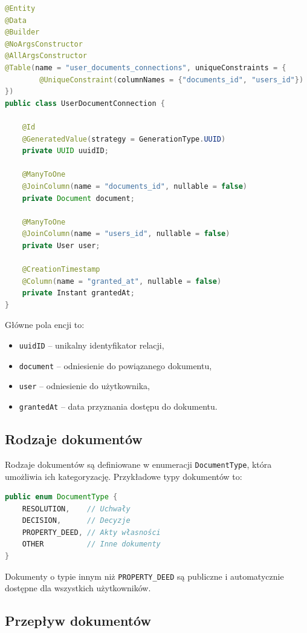 \begin{lstlisting}[language=Java, style=JavaStyle, caption=Encja \texttt{UserDocumentConnection}]
@Entity
@Data
@Builder
@NoArgsConstructor
@AllArgsConstructor
@Table(name = "user_documents_connections", uniqueConstraints = {
        @UniqueConstraint(columnNames = {"documents_id", "users_id"})
})
public class UserDocumentConnection {

    @Id
    @GeneratedValue(strategy = GenerationType.UUID)
    private UUID uuidID;

    @ManyToOne
    @JoinColumn(name = "documents_id", nullable = false)
    private Document document;

    @ManyToOne
    @JoinColumn(name = "users_id", nullable = false)
    private User user;

    @CreationTimestamp
    @Column(name = "granted_at", nullable = false)
    private Instant grantedAt;
}
\end{lstlisting}

\noindent Główne pola encji to:
\begin{itemize}
    \item \texttt{uuidID} -- unikalny identyfikator relacji,
    \item \texttt{document} -- odniesienie do powiązanego dokumentu,
    \item \texttt{user} -- odniesienie do użytkownika,
    \item \texttt{grantedAt} -- data przyznania dostępu do dokumentu.
\end{itemize}

\subsection{Rodzaje dokumentów}

Rodzaje dokumentów są definiowane w enumeracji \texttt{DocumentType}, która umożliwia ich kategoryzację. Przykładowe typy dokumentów to:


\begin{lstlisting}[language=Java, style=JavaStyle, caption=Enumeracja \texttt{DocumentType}]
public enum DocumentType {
    RESOLUTION,    // Uchwały
    DECISION,      // Decyzje
    PROPERTY_DEED, // Akty własności
    OTHER          // Inne dokumenty
}
\end{lstlisting}

Dokumenty o typie innym niż \texttt{PROPERTY\_DEED} są publiczne i automatycznie dostępne dla wszystkich użytkowników.

\subsection{Przepływ dokumentów}

